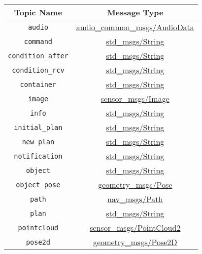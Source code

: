 \documentclass[a4paper]{article}
\begin{document}
\begin{center}
\begin{tabular}{|c|c|}\hline
Topic Name & Message Type \\\hline\hline
\verb!audio! & \href{http://docs.ros.org/hydro/api/audio\_common\_msgs/html/msg/AudioData.html}{audio\_common\_msgs/AudioData} \\\hline
\verb!command! & \href{http://docs.ros.org/api/std\_msgs/html/msg/String.html}{std\_msgs/String} \\\hline
\verb!condition_after! & \href{http://docs.ros.org/api/std\_msgs/html/msg/String.html}{std\_msgs/String} \\\hline
\verb!condition_rcv! & \href{http://docs.ros.org/api/std\_msgs/html/msg/String.html}{std\_msgs/String} \\\hline
\verb!container! & \href{http://docs.ros.org/api/std\_msgs/html/msg/String.html}{std\_msgs/String} \\\hline
\verb!image! & \href{http://docs.ros.org/api/sensor\_msgs/html/msg/Image.html}{sensor\_msgs/Image} \\\hline
\verb!info! & \href{http://docs.ros.org/api/std\_msgs/html/msg/String.html}{std\_msgs/String} \\\hline
\verb!initial_plan! & \href{http://docs.ros.org/api/std\_msgs/html/msg/String.html}{std\_msgs/String} \\\hline
\verb!new_plan! & \href{http://docs.ros.org/api/std\_msgs/html/msg/String.html}{std\_msgs/String} \\\hline
\verb!notification! & \href{http://docs.ros.org/api/std\_msgs/html/msg/String.html}{std\_msgs/String} \\\hline
\verb!object! & \href{http://docs.ros.org/api/std\_msgs/html/msg/String.html}{std\_msgs/String} \\\hline
\verb!object_pose! & \href{http://docs.ros.org/api/geometry\_msgs/html/msg/Pose.html}{geometry\_msgs/Pose} \\\hline
\verb!path! & \href{http://docs.ros.org/api/nav\_msgs/html/msg/Path.html}{nav\_msgs/Path} \\\hline
\verb!plan! & \href{http://docs.ros.org/api/std\_msgs/html/msg/String.html}{std\_msgs/String} \\\hline
\verb!pointcloud! & \href{http://docs.ros.org/api/sensor\_msgs/html/msg/PointCloud2.html}{sensor\_msgs/PointCloud2} \\\hline
\verb!pose2d! & \href{http://docs.ros.org/api/geometry\_msgs/html/msg/Pose2D.html}{geometry\_msgs/Pose2D} \\\hline

\end{tabular}
\end{center}
\end{document}
